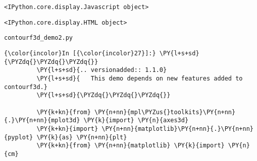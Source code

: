     
    \begin{verbatim}
<IPython.core.display.Javascript object>
    \end{verbatim}

    
    
    \begin{verbatim}
<IPython.core.display.HTML object>
    \end{verbatim}

    
    \texttt{contourf3d\_demo2.py}

    \begin{Verbatim}[commandchars=\\\{\},frame=single,framerule=0.3mm,rulecolor=\color{cellframecolor}]
{\color{incolor}In [{\color{incolor}27}]:} \PY{l+s+sd}{\PYZdq{}\PYZdq{}\PYZdq{}}
         \PY{l+s+sd}{.. versionadded:: 1.1.0}
         \PY{l+s+sd}{   This demo depends on new features added to contourf3d.}
         \PY{l+s+sd}{\PYZdq{}\PYZdq{}\PYZdq{}}
         
         \PY{k+kn}{from} \PY{n+nn}{mpl\PYZus{}toolkits}\PY{n+nn}{.}\PY{n+nn}{mplot3d} \PY{k}{import} \PY{n}{axes3d}
         \PY{k+kn}{import} \PY{n+nn}{matplotlib}\PY{n+nn}{.}\PY{n+nn}{pyplot} \PY{k}{as} \PY{n+nn}{plt}
         \PY{k+kn}{from} \PY{n+nn}{matplotlib} \PY{k}{import} \PY{n}{cm}
\end{Verbatim}


